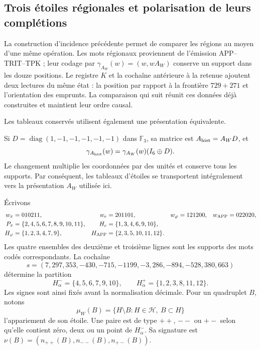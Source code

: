 \subsection{Trois étoiles régionales et polarisation de leurs complétions}
\label{star27:comparacion}

La construction d'incidence précédente permet de comparer les régions au moyen d'une même opération. Les mots régionaux proviennent de l'émission APP--TRIT--TPK ; leur codage par \(\gamma_{A_W}(w)=(w,wA_W)\) conserve un support dans les douze positions. Le registre \(K\) et la cochaîne antérieure à la retenue ajoutent deux lectures du même état : la position par rapport à la frontière \(729+271\) et l'orientation des emprunts. La comparaison qui suit réunit ces données déjà construites et maintient leur ordre causal.

Les tableaux conservés utilisent également une présentation équivalente.
\par %
Si \(D=\operatorname{diag}(1,-1,-1,-1,-1,-1)\) dans
\(\mathbb F_3\), sa matrice est \(A_{\rm hist}=A_WD\), et
\[
\gamma_{A_{\rm hist}}(w)=\gamma_{A_W}(w)(I_6\oplus D).
\]
Le changement multiplie les coordonnées par des unités et conserve tous les
supports. Par conséquent, les tableaux d'étoiles se transportent
intégralement vers la présentation \(A_W\) utilisée ici.

Écrivons
\[
\begin{aligned}
w_\pi&=010211,&w_e&=201101,&
w_\varphi&=121200,&w_{\rm APP}&=022020,\\
P_\pi&=\{2,4,5,6,7,8,9,10,11\},&
H_e&=\{1,3,4,6,9,10\},\\
H_\varphi&=\{1,2,3,4,7,9\},&
H_{\rm APP}&=\{2,3,5,10,11,12\}.
\end{aligned}
\]
Les quatre ensembles des deuxième et troisième lignes sont les supports
des mots codés correspondants. La cochaîne
\[
s=(7,297,353,-430,-715,-1199,-3,286,-894,-528,380,663)
\]
détermine la partition
\[
H^-_\alpha=\{4,5,6,7,9,10\},\qquad
H^+_\alpha=\{1,2,3,8,11,12\}.
\]
Les signes sont ainsi fixés avant la normalisation décimale.
Pour un quadruplet \(B\), notons
\[
\mu_W(B)=\{H\setminus B:H\in\mathcal H,\ B\subset H\}
\]
l'appariement de son étoile. Une paire est de type \(++\), \(--\) ou \(+-\) selon qu'elle contient zéro, deux ou un point de \(H^-_\alpha\). Sa signature est \(\nu(B)=(n_{++}(B),n_{--}(B),n_{+-}(B))\).

